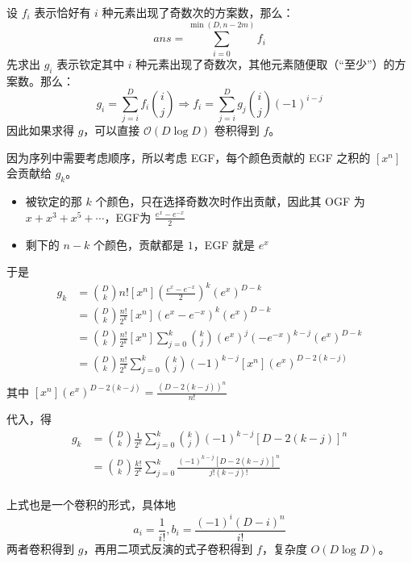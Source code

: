 \documentclass[UTF8]{beamer}
\begin{document}
    \begin{frame}
        设 $f_i$ 表示恰好有 $i$ 种元素出现了奇数次的方案数，那么：
        $$
        ans=\sum_{i=0}^{\min(D,n-2m)}f_i
        $$
        \pause
        先求出 $g_i$ 表示钦定其中 $i$ 种元素出现了奇数次，其他元素随便取（“至少”）的方案数。那么：
        $$
        g_i=\sum_{j=i}^{D}f_i\binom{i}{j}\Rightarrow f_i=\sum_{j=i}^{D}g_j\binom{i}{j}(-1)^{i-j}
        $$
        因此如果求得 $g$，可以直接 $\mathcal O(D\log D)$ 卷积得到 $f$。
    \end{frame}

    \begin{frame}
        因为序列中需要考虑顺序，所以考虑 EGF，每个颜色贡献的 EGF 之积的 $[x^n]$ 会贡献给 $g_k$。
        
        \begin{itemize}
            \item 被钦定的那 $k$ 个颜色，只在选择奇数次时作出贡献，因此其 OGF 为 $x+x^3+x^5+\cdots$，EGF为 $\frac{e^x-e^{-x}}{2}$
            \item 剩下的 $n-k$ 个颜色，贡献都是 $1$，EGF 就是 $e^x$
        \end{itemize}

        于是
        $$
        \begin{aligned}
            g_k&=\binom{D}{k}n![x^n](\frac{e^x-e^{-x}}{2})^k(e^x)^{D-k}\\
            &=\binom{D}{k}\frac{n!}{2^k}[x^n](e^x-e^{-x})^k(e^x)^{D-k}\\
            &=\binom{D}{k}\frac{n!}{2^k}[x^n]\sum_{j=0}^{k}\binom{k}{j}(e^x)^j(-e^{-x})^{k-j}(e^x)^{D-k}\\
            &=\binom{D}{k}\frac{n!}{2^k}\sum_{j=0}^{k}\binom{k}{j}(-1)^{k-j}[x^n](e^x)^{D-2(k-j)}\\
        \end{aligned}
        $$
        其中 $[x^n](e^x)^{D-2(k-j)} = \frac{(D-2(k-j))^n}{n!}$
        
    \end{frame}

    \begin{frame}
        代入，得
        $$
        \begin{aligned}
            g_k&=\binom{D}{k}\frac{1}{2^k}\sum_{j=0}^{k}\binom{k}{j}(-1)^{k-j}[D-2(k-j)]^{n}\\
            &=\binom{D}{k}\frac{k!}{2^k}\sum_{j=0}^{k}\frac{(-1)^{k-j}[D-2(k-j)]^{n}}{j!(k-j)!}\\
            \end{aligned}
        $$

        上式也是一个卷积的形式，具体地
        $$
        a_i=\frac{1}{i!},b_i=\frac{(-1)^{i}(D-i)^n}{i!}
        $$
        两者卷积得到 $g$，再用二项式反演的式子卷积得到 $f$，复杂度 $O(D\log D)$。
    \end{frame}
\end{document}
